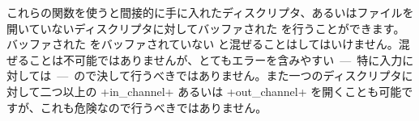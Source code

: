 %
これらの関数を使うと間接的に手に入れたディスクリプタ、あるいはファイルを開いていないディスクリプタに対してバッファされた \io を行うことができます。バッファされた \io をバッファされていない \io と混ぜることはしてはいけません。混ぜることは不可能ではありませんが、とてもエラーを含みやすい~---~特に入力に対しては~---~ので決して行うべきではありません。また一つのディスクリプタに対して二つ以上の \ml+in_channel+ あるいは \ml+out_channel+ を開くことも可能ですが、これも危険なので行うべきではありません。


